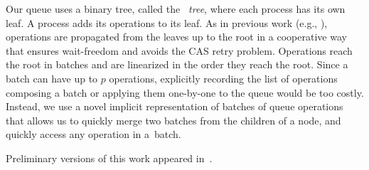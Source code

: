 Our queue uses a binary tree, called the \emph{\ordering\ tree}, where each process has its own leaf.
A process adds its operations to its leaf.
As in previous work (e.g., \cite{DBLP:conf/stoc/AfekDT95,DBLP:conf/fsttcs/JayantiP05}), operations are propagated from the leaves up to the root in a cooperative way that ensures wait-freedom
and avoids the CAS retry problem.
Operations reach the root in batches and are linearized in the order they reach the root.
Since a batch can have up to $p$ operations, explicitly recording the list of operations composing a batch
or applying them one-by-one to the queue would be too costly.
Instead, we use a novel implicit representation of batches
of queue operations that allows us to quickly merge two batches from the children of a node,
and quickly access any  operation in a~batch.

Preliminary versions of this work appeared in~\cite{Nad22,NR23}.
